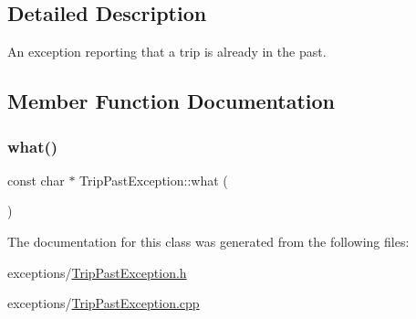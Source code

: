 \subsection{Detailed Description}
An exception reporting that a trip is already in the past. 

\subsection{Member Function Documentation}
\mbox{\label{classTripPastException_a917f7042145fb1cbc2d43efb9f43f3f6}} 
\subsubsection{\texorpdfstring{what()}{what()}}
{\footnotesize\ttfamily const char $\ast$ Trip\+Past\+Exception\+::what (\begin{DoxyParamCaption}{ }\end{DoxyParamCaption})}



The documentation for this class was generated from the following files\+:\begin{DoxyCompactItemize}
\item 
exceptions/\mbox{\hyperlink{TripPastException_8h}{Trip\+Past\+Exception.\+h}}\item 
exceptions/\mbox{\hyperlink{TripPastException_8cpp}{Trip\+Past\+Exception.\+cpp}}\end{DoxyCompactItemize}
